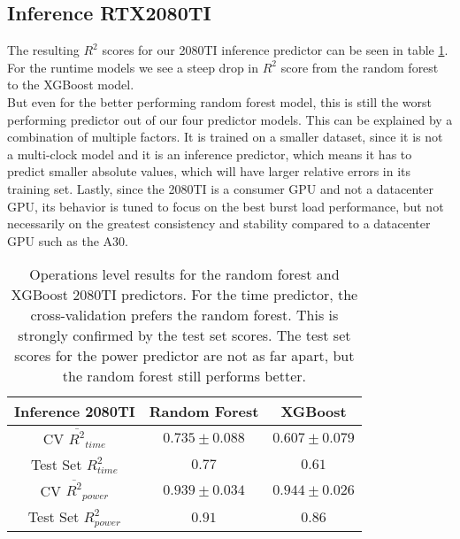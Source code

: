 \subsection{Inference RTX2080TI}

The resulting $R^2$ scores for our 2080TI inference predictor can be seen in table \ref{tab:pred_res_2080_inf}. For the runtime models we see a steep drop in $R^2$ score from the random forest to the XGBoost model. \\
But even for the better performing random forest model, this is still the worst performing predictor out of our four predictor models. This can be explained by a combination of multiple factors. It is trained on a smaller dataset, since it is not a multi-clock model and it is an inference predictor, which means it has to predict smaller absolute values, which will have larger relative errors in its training set. Lastly, since the 2080TI is a consumer GPU and not a datacenter GPU, its behavior is tuned to focus on the best burst load performance, but not necessarily on the greatest consistency and stability compared to a datacenter GPU such as the A30.


\begin{table}[h!]
\centering
\begin{tabular}{|c|c|c|}
\hline
 \textbf{Inference 2080TI}& \textbf{Random Forest} & \textbf{XGBoost} \\
\hline
CV $\overline{R^2}_{time}$ & $0.735 \pm 0.088$ &  $0.607 \pm 0.079$ \\
\hline
Test Set $R^2_{time}$ & $0.77$ & $0.61$ \\
\hline
CV $\overline{R^2}_{power}$ & $0.939 \pm 0.034$  &  $0.944 \pm 0.026$\\
\hline
Test Set $R^2_{power}$ & $0.91$ & $0.86$ \\
\hline
\end{tabular}
\caption{Operations level results for the random forest and XGBoost 2080TI predictors. For the time predictor, the cross-validation prefers the random forest. This is strongly confirmed by the test set scores. The test set scores for the power predictor are not as far apart, but the random forest still performs better.}
\label{tab:pred_res_2080_inf}
\end{table}


